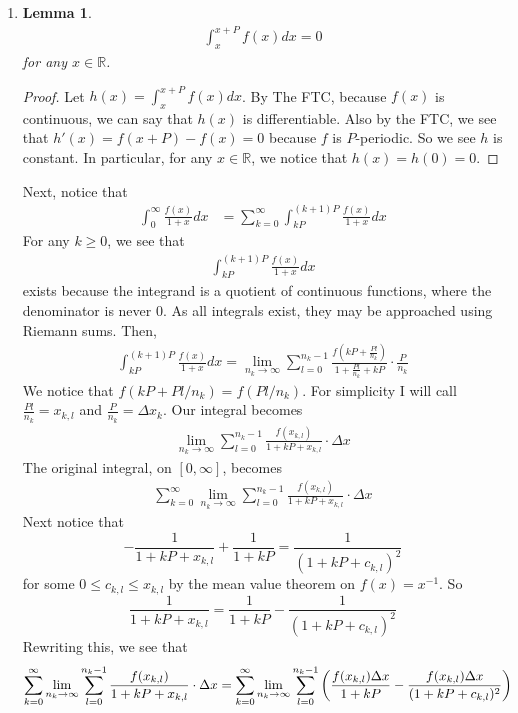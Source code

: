 \documentclass[12pt]{article}
\newtheorem{lemma}[theorem]{Lemma}
\theoremstyle{definition}
\theoremstyle{remark}
\newcommand{\R}{\mathbb{R}}
\begin{document}
\begin{enumerate}[leftmargin=\labelsep]
		\item 
		\begin{lemma}
			\begin{align*}
				\int_x^{x+P} f(x)dx = 0
			\end{align*}
		for any $x \in \R$.
		\end{lemma}
		\begin{proof}
			Let $h(x) = \int_x^{x+P} f(x)dx$. By The FTC, because $f(x)$ is continuous, we can say that $h(x)$ is differentiable. Also by the FTC, we see that $h'(x) = f(x+P)-f(x) = 0$ because $f$ is $P$-periodic. So we see $h$ is constant. In particular, for any $x \in \R$, we notice that $h(x) = h(0) = 0$.
		\end{proof}
		Next, notice that 
		\begin{align*}
			\int_0^\infty \frac{f(x)}{1+x}dx &= \sum_{k=0}^{\infty} \int_{kP}^{(k+1)P} \frac{f(x)}{1+x}dx
		\end{align*}
		For any $k \geq 0$, we see that 
		\begin{align*}
			\int_{kP}^{(k+1)P} \frac{f(x)}{1+x}dx
		\end{align*}
		exists because the integrand is a quotient of continuous functions, where the denominator is never 0. As all integrals exist, they may be approached using Riemann sums. Then,
		\begin{align*}
			\int_{kP}^{(k+1)P} \frac{f(x)}{1+x}dx = \lim_{n_k \to \infty} \sum_{l=0}^{n_k-1} \frac{f(kP + \frac {Pl}{n_k})}{1+\frac{Pl}{n_k}+kP} \cdot \frac P{n_k}
		\end{align*}
		We notice that $f(kP+Pl/n_k) = f(Pl/n_k)$. For simplicity I will call $\frac{Pl}{n_k} = x_{k,l}$ and $\frac P{n_k} = \Delta x_{k}$. Our integral becomes
		\begin{align*}
			\lim_{n_k \to \infty} \sum_{l=0}^{n_k-1} \frac{f(x_{k,l})}{1+kP+x_{k,l}} \cdot \Delta x
		\end{align*}
		The original integral, on $[0, \infty]$, becomes 
		\begin{align*}
			\sum_{k=0}^{\infty} \lim_{n_k \to \infty} \sum_{l=0}^{n_k-1} \frac{f(x_{k,l})}{1+kP+x_{k,l}} \cdot \Delta x
		\end{align*}
		Next notice that $$-\frac{1}{1+kP+x_{k,l}}+\frac1{1+kP} = \frac1{(1+kP+c_{k,l})^2}$$ for some $0 \leq c_{k,l} \leq x_{k,l}$ by the mean value theorem on $f(x) = x^{-1}$. So $$\frac{1}{1+kP+x_{k,l}} = \frac1{1+kP} - \frac1{(1+kP+c_{k,l})^2}$$
		Rewriting this, we see that 
		\begin{align*}
			\sum_{k=0}^{\infty} \lim_{n_k \to \infty} \sum_{l=0}^{n_k-1} \frac{f(x_{k,l})}{1+kP+x_{k,l}} \cdot \Delta x &= \sum_{k=0}^{\infty} \lim_{n_k \to \infty} \sum_{l=0}^{n_k-1} \qty(\frac{f(x_{k,l}) \Delta x}{1+kP} - \frac{f(x_{k,l})\Delta x}{(1+kP+c_{k,l})^2})

\end{align*}
\end{enumerate}
\end{document}
